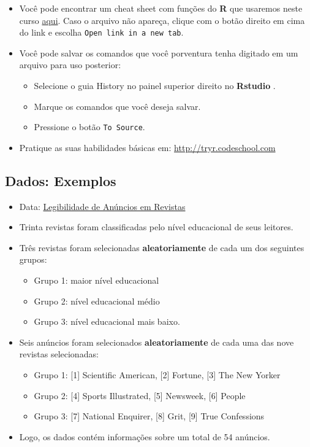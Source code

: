 \documentclass[]{article}
\providecommand{\tightlist}{%
  \setlength{\itemsep}{0pt}\setlength{\parskip}{0pt}}
\begin{document}
\begin{itemize}
\tightlist
\item
  Você pode encontrar um cheat sheet com funções do \textbf{R} que
  usaremos neste curso
  \href{https://drive.google.com/open?id=1678x0r9WNYQJlQPlovgIbwgp1hN5dt5c}{aqui}.
  Caso o arquivo não apareça, clique com o botão direito em cima do link
  e escolha \texttt{Open\ link\ in\ a\ new\ tab}.
\item
  Você pode salvar os comandos que você porventura tenha digitado em um
  arquivo para uso posterior:

  \begin{itemize}
  \tightlist
  \item
    Selecione o guia History no painel superior direito no
    \textbf{Rstudio} .
  \item
    Marque os comandos que você deseja salvar.
  \item
    Pressione o botão \texttt{To\ Source}.
  \end{itemize}
\item
  Pratique as suas habilidades básicas em:
  \url{http://tryr.codeschool.com}
\end{itemize}

\subsection{Dados: Exemplos}\label{dados-exemplos}

\begin{itemize}
\tightlist
\item
  Data:
  \href{http://lib.stat.cmu.edu/DASL/Datafiles/magadsdat.html}{Legibilidade
  de Anúncios em Revistas}
\item
  Trinta revistas foram classificadas pelo nível educacional de seus
  leitores.
\item
  Três revistas foram selecionadas \textbf{aleatoriamente} de cada um
  dos seguintes grupos:

  \begin{itemize}
  \tightlist
  \item
    Grupo 1: maior nível educacional
  \item
    Grupo 2: nível educacional médio
  \item
    Grupo 3: nível educacional mais baixo.
  \end{itemize}
\item
  Seis anúncios foram selecionados \textbf{aleatoriamente} de cada uma
  das nove revistas selecionadas:

  \begin{itemize}
  \tightlist
  \item
    Grupo 1: {[}1{]} Scientific American, {[}2{]} Fortune, {[}3{]} The
    New Yorker
  \item
    Grupo 2: {[}4{]} Sports Illustrated, {[}5{]} Newsweek, {[}6{]}
    People
  \item
    Grupo 3: {[}7{]} National Enquirer, {[}8{]} Grit, {[}9{]} True
    Confessions
  \end{itemize}
\item
  Logo, os dados contém informações sobre um total de 54 anúncios.
\end{itemize}
\end{document}
